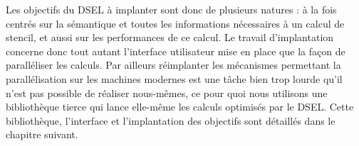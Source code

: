 Les objectifs du DSEL à implanter sont donc de plusieurs natures : à la fois centrés sur la sémantique et toutes les informations nécessaires à un calcul de stencil, et aussi sur les performances de ce calcul. Le travail d'implantation concerne donc tout autant l'interface utilisateur mise en place que la façon de paralléliser les calculs. Par ailleurs réimplanter les mécanismes permettant la parallélisation sur les machines modernes est une tâche bien trop lourde qu'il n'est pas possible de réaliser nous-mêmes, ce pour quoi nous utilisons une bibliothèque tierce qui lance elle-même les calculs optimisés par le DSEL. Cette bibliothèque, l'interface et l'implantation des objectifs sont détaillés dans le chapitre suivant.
